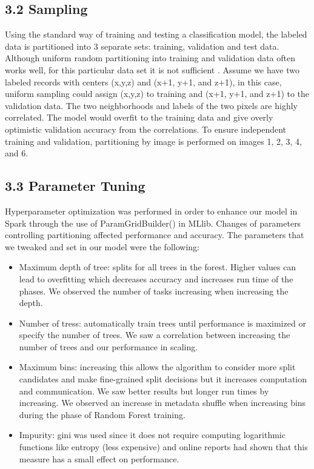 \documentclass{neu_handout}
\begin{document}
\subsection*{3.2 Sampling}
Using the standard way of training and testing a classification model, the labeled data is partitioned into 3 separate sets: training, validation and test data. Although uniform random partitioning into training and validation data often works well, for this particular data set it is not sufficient \cite{learnimbal}. Assume we have two labeled records with centers (x,y,z) and (x+1, y+1, and z+1), in this case, uniform sampling could assign (x,y,z) to training and (x+1, y+1, and z+1) to the validation data. The two neighborhoods and labels of the two pixels are highly correlated. The model would overfit to the training data and give overly optimistic validation accuracy from the correlations. To ensure independent training and validation, partitioning by image is performed on images 1, 2, 3, 4, and 6.\\

\subsection*{3.3 Parameter Tuning}

Hyperparameter optimization was performed in order to enhance our model in Spark through the use of ParamGridBuilder() in MLlib. Changes of parameters controlling partitioning affected performance and accuracy. The parameters that we tweaked and set in our model were the following:

\begin{itemize}
\setlength\itemsep{0.2em}
\item Maximum depth of tree: splits for all trees in the forest. Higher values can lead to overfitting which decreases accuracy and increases run time of the phases. We observed the number of tasks increasing when increasing the depth.
\item Number of tress: automatically train trees until performance is maximized or specify the number of trees. We saw a correlation between increasing the number of trees and our performance in scaling.
\item Maximum bins: increasing this allows the algorithm to consider more split candidates and make fine-grained split decisions but it increases computation and communication. We saw better results but longer run times by increasing. We observed an increase in metadata shuffle when increasing bins during the phase of Random Forest training.
\item Impurity: gini was used since it does not require computing logarithmic functions like entropy (less expensive) and online reports had shown that this measure has a small effect on performance.
\end{itemize}
\end{document}
